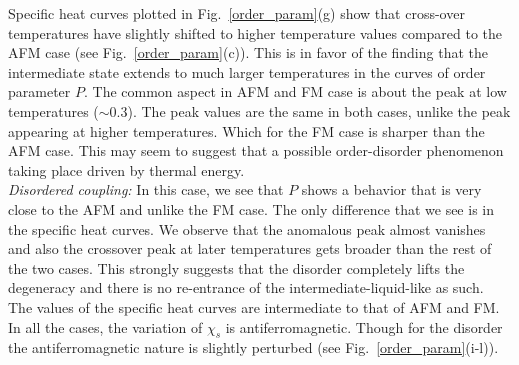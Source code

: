 \indent Specific heat curves plotted in Fig.~\ref{order_param}(g) show that cross-over temperatures have slightly shifted to higher temperature values compared to the AFM case (see Fig.~\ref{order_param}(c)). This is in favor of the finding that the intermediate state extends to much larger temperatures in the curves of order parameter $P$. The common aspect in AFM and FM case is about the peak at low temperatures ($\sim 0.3$).
The peak values are the same in both cases, unlike the peak appearing at higher temperatures. Which for the FM case is sharper than the AFM case. This may seem to suggest that a possible order-disorder phenomenon taking place driven by thermal energy. \\
\indent \textit{Disordered coupling:} In this case, we see that $P$ shows a behavior that is very close to the AFM and unlike the FM case. The only difference that we see is in the specific heat curves. We observe that the anomalous peak almost vanishes and also the crossover peak at later temperatures gets broader than the rest of the two cases. This strongly suggests that the disorder completely lifts the degeneracy and there is no re-entrance of the intermediate-liquid-like as such. The values of the specific heat curves are intermediate to that of AFM and FM. In all the cases, the variation of $\chi_s$ is antiferromagnetic. Though for the disorder the antiferromagnetic nature is slightly perturbed (see Fig.~\ref{order_param}(i-l)).\\
